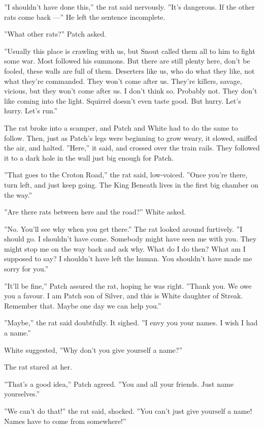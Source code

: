 \documentclass[12pt]{book}
\begin{document}
''I shouldn't have done this,'' the rat said nervously. ''It's
dangerous. If the other rats come back ---'' He left the sentence
incomplete.

''What other rats?'' Patch asked.

''Usually this place is crawling with us, but Snout called them all to
him to fight some war. Most followed his summons. But there are still
plenty here, don't be fooled, these walls are full of them. Deserters
like us, who do what they like, not what they're commanded. They won't
come after us. They're killers, savage, vicious, but they won't come
after us. I don't think so. Probably not. They don't like coming into
the light. Squirrel doesn't even taste good. But hurry. Let's
hurry. Let's run.''

The rat broke into a scamper, and Patch and White had to do the same
to follow. Then, just as Patch's legs were beginning to grow weary, it
slowed, sniffed the air, and halted. ''Here,'' it said, and crossed
over the train rails. They followed it to a dark hole in the wall just
big enough for Patch.

''That goes to the Croton Road,'' the rat said, low-voiced. ''Once
you're there, turn left, and just keep going. The King Beneath lives
in the first big chamber on the way.''

''Are there rats between here and the road?'' White asked.

''No. You'll see why when you get there.'' The rat looked around
furtively. ''I should go. I shouldn't have come. Somebody might have
seen me with you. They might stop me on the way back and ask why. What
do I do then? What am I supposed to say? I shouldn't have left the
human. You shouldn't have made me sorry for you.''

''It'll be fine,'' Patch assured the rat, hoping he was right. ''Thank
you. We owe you a favour. I am Patch son of Silver, and this is White
daughter of Streak. Remember that. Maybe one day we can help you.''

''Maybe,'' the rat said doubtfully. It sighed. ''I envy you your
names. I wish I had a name.''

White suggested, ''Why don't you give yourself a name?''

The rat stared at her.

''That's a good idea,'' Patch agreed. ''You and all your friends. Just
name yourselves.''

''We can't do that!'' the rat said, shocked. ''You can't just give
yourself a name! Names have to come from somewhere!''
\end{document}
